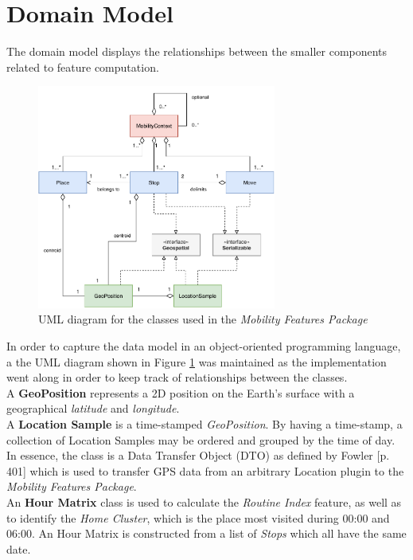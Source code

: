 \clearpage
\section{Domain Model}
The domain model displays the relationships between the smaller components related to feature computation.

\begin{figure}[h]
    \centering
    \includegraphics[width=0.7\textwidth]{images/diagrams/data-model-diagram.pdf}
    \caption{UML diagram for the classes used in the \textit{Mobility Features Package}}
    \label{fig:uml-diagram}
\end{figure}

In order to capture the data model in an object-oriented programming language, a the UML diagram shown in Figure \ref{fig:uml-diagram} was maintained as the implementation went along in order to keep track of relationships between the classes.\\

A \textbf{GeoPosition} represents a 2D position on the Earth's surface with a geographical \textit{latitude} and \textit{longitude}.\\

A \textbf{Location Sample} is a time-stamped \textit{GeoPosition}. By having a time-stamp, a collection of Location Samples may be ordered and grouped by the time of day. In essence, the class is a Data Transfer Object (DTO) as defined by Fowler \cite{fowler-PEEA} [p. 401] which is used to transfer GPS data from an arbitrary Location plugin to the \textit{Mobility Features Package}.\\

An \textbf{Hour Matrix} class is used to calculate the \textit{Routine Index} feature, as well as to identify the \textit{Home Cluster}, which is the place most visited during 00:00 and 06:00. An Hour Matrix is constructed from a list of \textit{Stops} which all have the same date.\\

